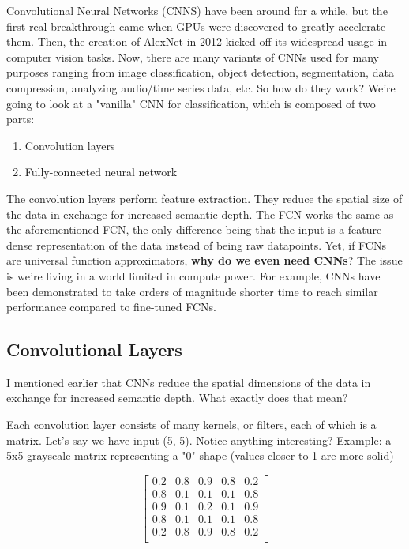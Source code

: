 \documentclass[12pt]{article}
\begin{document}
Convolutional Neural Networks (CNNS) have been around for a while, but the first real breakthrough came when GPUs were discovered to greatly accelerate them. Then, the creation of AlexNet in 2012 kicked off its widespread usage in computer vision tasks. Now, there are many variants of CNNs used for many purposes ranging from image classification, object detection, segmentation, data compression, analyzing audio/time series data, etc. So how do they work? We're going to look at a "vanilla" CNN for classification, which is composed of two parts:

\begin{enumerate}
  \item Convolution layers
  \item Fully-connected neural network
\end{enumerate}

The convolution layers perform feature extraction. They reduce the spatial size of the data in exchange for increased semantic depth. The FCN works the same as the aforementioned FCN, the only difference being that the input is a feature-dense representation of the data instead of being raw datapoints. Yet, if FCNs are universal function approximators, \textbf{why do we even need CNNs}? The issue is we're living in a world limited in compute power. For example, CNNs have been demonstrated to take orders of magnitude shorter time to reach similar performance compared to fine-tuned FCNs. 

\subsection{Convolutional Layers}
I mentioned earlier that CNNs reduce the spatial dimensions of the data in exchange for increased semantic depth. What exactly does that mean? 

Each convolution layer consists of many kernels, or filters, each of which is a matrix. Let's say we have input (5, 5). Notice anything interesting? Example: a 5x5 grayscale matrix representing a "0" shape (values closer to 1 are more solid)

\[
\begin{bmatrix}
0.2 & 0.8 & 0.9 & 0.8 & 0.2 \\
0.8 & 0.1 & 0.1 & 0.1 & 0.8 \\
0.9 & 0.1 & 0.2 & 0.1 & 0.9 \\
0.8 & 0.1 & 0.1 & 0.1 & 0.8 \\
0.2 & 0.8 & 0.9 & 0.8 & 0.2 \\
\end{bmatrix}
\]
\end{document}

